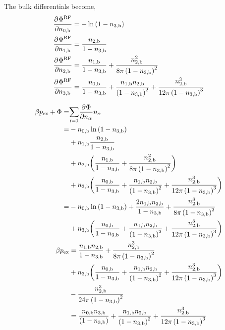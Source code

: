 \documentclass[12pt, letterpaper]{article}
\newcommand*{\pd}[3][]{\frac{\partial^{#1}#2}{\partial{#3}^{#1}}}%
\newcommand*{\lb}{\ensuremath{\left(}}
\newcommand*{\rb}{\ensuremath{\right)}}
\newcommand{\RF}{\ensuremath{\text{RF}}\xspace}
\newcommand{\excess}{\ensuremath{\text{ex}}\xspace}
\newcommand{\bulk}{\ensuremath{\text{b}}\xspace}
\begin{document}
The bulk differentials become,
\begin{align}
  \pd{\Phi^\RF}{n_{0,\bulk}} &= -\ln \lb 1 - n_{3,\bulk} \rb \\
  \pd{\Phi^\RF}{n_{1,\bulk}} &= \frac{n_{2,\bulk}}{1 - n_{3,\bulk}} \\
  \pd{\Phi^\RF}{n_{2,\bulk}} &= \frac{n_{1,\bulk}}{1 - n_{3,\bulk}} + \frac{n_{2,\bulk}^2}{8\pi \lb 1 - n_{3,\bulk} \rb^2} \\
  \pd{\Phi^\RF}{n_{3,\bulk}} &= \frac{n_{0,\bulk}}{1 - n_{3,\bulk}} +
  \frac{n_{1,\bulk} n_{2,\bulk}}{\lb 1 - n_{3,\bulk} \rb^2} +
  \frac{n_{2,\bulk}^3}{12\pi \lb 1 - n_{3,\bulk} \rb^3}
\end{align}

\begin{align}
  \beta p_{\excess} + \Phi =& \underset{i=1}{\sum} \pd{\Phi}{n_{\alpha}}n_{\alpha} \nonumber \\
  = & -n_{0,\bulk} \ln \lb 1 - n_{3,\bulk} \rb \nonumber \\
      &+ n_{1,\bulk}\frac{n_{2,\bulk}}{1 - n_{3,\bulk}} \nonumber \\
      &+ n_{2,\bulk} \biggl(\frac{n_{1,\bulk}}{1 - n_{3,\bulk}} + \frac{n_{2,\bulk}^2}{8\pi \lb 1 - n_{3,\bulk} \rb^2} \biggr) \nonumber \\
      &+ n_{3,\bulk} \biggl(\frac{n_{0,\bulk}}{1 - n_{3,\bulk}} + 
      \frac{n_{1,\bulk} n_{2,\bulk}}{\lb 1 - n_{3,\bulk} \rb^2} +
        \frac{n_{2,\bulk}^3}{12\pi \lb 1 - n_{3,\bulk} \rb^3} \biggr) \nonumber\\
    = & -n_{0,\bulk} \ln \lb 1 - n_{3,\bulk} \rb 
      + \frac{2n_{1,\bulk}n_{2,\bulk}}{1 - n_{3,\bulk}}
      + \frac{n_{2,\bulk}^3}{8\pi \lb 1 - n_{3,\bulk} \rb^2}  \nonumber \\
      &+ n_{3,\bulk} \biggl(\frac{n_{0,\bulk}}{1 - n_{3,\bulk}} + 
      \frac{n_{1,\bulk} n_{2,\bulk}}{\lb 1 - n_{3,\bulk} \rb^2} +
        \frac{n_{2,\bulk}^3}{12\pi \lb 1 - n_{3,\bulk} \rb^3} \biggr) \\
  \beta p_{\excess} &= \frac{n_{1,\bulk}n_{2,\bulk}}{1 - n_{3,\bulk}}
      + \frac{n_{2,\bulk}^3}{8\pi \lb 1 - n_{3,\bulk} \rb^2}  \nonumber \\
      &+ n_{3,\bulk} \biggl(\frac{n_{0,\bulk}}{1 - n_{3,\bulk}} + 
      \frac{n_{1,\bulk} n_{2,\bulk}}{\lb 1 - n_{3,\bulk} \rb^2} +
        \frac{n_{2,\bulk}^3}{12\pi \lb 1 - n_{3,\bulk} \rb^3} \biggr) \nonumber\\
                            &- \frac{n_{2,\bulk}^3 }{24\pi \lb 1 - n_{3,\bulk} \rb^2} \nonumber\\
                            &= \frac{n_{0,\bulk}n_{3,\bulk}}{\lb 1 - n_{3,\bulk} \rb} + \frac{n_{1,\bulk} n_{2,\bulk}}{\lb 1 - n_{3,\bulk} \rb^2} + \frac{n_{2,\bulk}^3}{12 \pi\lb 1 - n_{3,\bulk} \rb^3}
\end{align}
\end{document}
